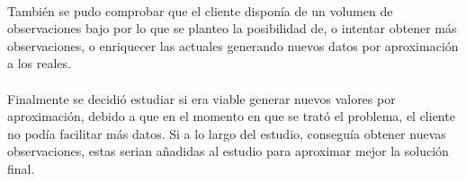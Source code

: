 \paragraph{}
También se pudo comprobar que el cliente disponía de un volumen de observaciones bajo por lo que se planteo la posibilidad de, o intentar obtener más observaciones, o enriquecer las actuales generando nuevos datos por aproximación a los reales.

\paragraph{}
Finalmente se decidió estudiar si era viable generar nuevos valores por aproximación, debido a que en el momento en que se trató el problema, el cliente no podía facilitar más datos. Si a lo largo del estudio, conseguía obtener nuevas observaciones, estas serian añadidas al estudio para aproximar mejor la solución final.






